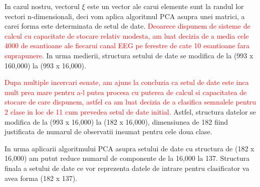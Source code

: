In cazul nostru, vectorul $ \xi $ este un vector ale carui elemente sunt la
randul lor vectori n-dimensionali, deci vom aplica algoritmul PCA asupra unei matrici,
a carei forma este determinata de setul de date.
\textcolor{red}{Deoarece dispunem de sisteme de calcul cu capacitate de stocare 
relativ modesta, am luat decizia de a media cele 4000 de esantioane ale fiecarui
canal EEG pe ferestre de cate 10 esantioane fara suprapunere.} In urma medierii,
structura setului de date se modifica de la (993 x 160,000) la (993 x 16,000).


\textcolor{red}{Dupa multiple incercari esuate, am ajuns la concluzia ca setul de date
este inca mult prea mare pentru a-l putea procesa cu puterea de calcul si capacitatea
de stocare de care dispunem, astfel ca am luat decizia de a clasifica semnalele 
pentru 2 clase in loc de 11 cum prevedea setul de date initial.} Astfel, structura
datelor se modifica de la (993 x 16,000) la (182 x 16,000), dimensiunea de 182
fiind justificata de numarul de observatii insumat pentru cele doua clase.

\vspace{0.3cm}
In urma aplicarii algoritmului PCA asupra setului de date cu structura de 
(182 x 16,000) am putut reduce numarul de componente de la 16,000 la
137. Structura finala a setului de date ce vor reprezenta datele de intrare pentru 
clasificator va avea forma (182 x 137).

